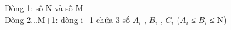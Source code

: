Dòng 1: số N và số M   
\\   Dòng 2...M+1: dòng i+1 chứa 3 số $A_{i}$   , $B_{i}$   , $C_{i}$   ($A_{i}$   ≤ $B_{i}$   ≤ N)